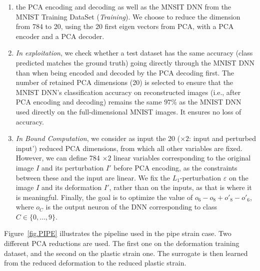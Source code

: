 \begin{enumerate}
\item  the PCA encoding and decoding as well as the MNSIT DNN from the MNIST Training DataSet ({\em Training}).
We choose to reduce the dimension from 784 to 20, using the 20 first eigen vectors from PCA, with a PCA encoder and a PCA decoder.

\item {\em In exploitation}, we check whether a test dataset has the same accuracy (class predicted matches the ground truth) 
going directly through the MNIST DNN than when being encoded and decoded by the PCA decoding first.
The number of retained PCA dimensions (20) is selected to ensure that the MNIST DNN's classification accuracy on reconstructed images (i.e., after PCA encoding and decoding) remains the same $97$\% as the MNIST DNN used directly on the full-dimensional MNIST images.
It ensures no loss of accuracy.
%
\item {\em In Bound Computation}, we consider as input the 20 ($\times 2$: input and perturbed input') reduced PCA dimensions, from which all other variables are fixed.
However, we can define 784 $\times 2$ linear variables corresponding to the original image $I$ and its perturbation $I'$ before PCA encoding, as the constraints between these and the input are linear.
We fix the $L_1$-perturbation $\varepsilon$ on the image $I$ and its deformation $I'$, rather than on the inputs, as that is where it is meaningful.
Finally, the goal is to optimize the value of $o_6 -o_8+ o'_8 - o'_6$,  where $o_C$ is the output neuron of the DNN corresponding to class $C \in \{0,\ldots, 9\}$.
\end{enumerate}

%
%

\newpage


Figure~\ref{fig.PIPE} illustrates the pipeline used in the pipe strain case. 
Two different PCA reductions are used. The first one on the deformation training dataset, 
and the second on the plastic strain one.
%
The surrogate is then learned from the reduced deformation to the reduced plastic strain. 
%

